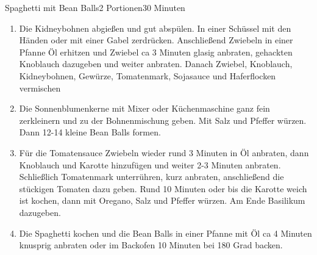 \documentclass{article}
\begin{document}
\begin{recipe}{Spaghetti mit Bean Balls}{2 Portionen}{30 Minuten}
\begin{enumerate}
  \item Die Kidneybohnen abgießen und gut abspülen. In einer Schüssel mit den Händen oder mit einer Gabel zerdrücken. Anschließend Zwiebeln in einer Pfanne Öl erhitzen und Zwiebel ca 3 Minuten glasig anbraten, gehackten Knoblauch dazugeben und weiter anbraten. Danach Zwiebel, Knoblauch, Kidneybohnen, Gewürze, Tomatenmark, Sojasauce und Haferflocken vermischen
  \item Die Sonnenblumenkerne mit Mixer oder Küchenmaschine ganz fein zerkleinern und zu der Bohnenmischung geben. Mit Salz und Pfeffer würzen. Dann 12-14 kleine Bean Balls formen.
  \item Für die Tomatensauce Zwiebeln wieder rund 3 Minuten in Öl anbraten, dann Knoblauch und Karotte hinzufügen und weiter 2-3 Minuten anbraten. Schließlich Tomatenmark unterrühren, kurz anbraten, anschließend die stückigen Tomaten dazu geben. Rund 10 Minuten oder bis die Karotte weich ist kochen, dann mit Oregano, Salz und Pfeffer würzen. Am Ende Basilikum dazugeben.
\item Die Spaghetti kochen und die Bean Balls in einer Pfanne mit Öl ca 4 Minuten knusprig anbraten oder im Backofen 10 Minuten bei 180 Grad backen. 
\end{enumerate}
\end{recipe}
\end{document}
